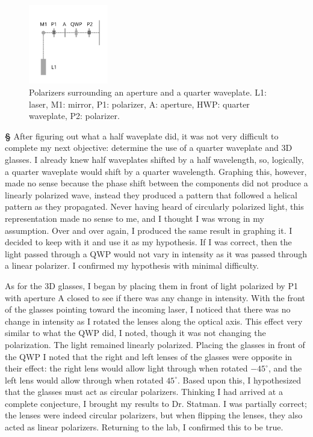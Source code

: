 \documentclass[12pt]{article}
\begin{document}
\newpage
\noindent
\begin{figure}
  \begin{center}
    \includegraphics[width=0.31\textwidth]{E2}
  \end{center}
  \caption{Polarizers surrounding an aperture and a quarter waveplate. L1: laser, M1: mirror, P1: polarizer, A: aperture, HWP: quarter waveplate, P2: polarizer.}\label{E2}
\end{figure}
\large{\textbf{\S}}
After figuring out what a half waveplate did, it was not very difficult to complete my next objective: determine the use of a quarter waveplate and 3D glasses. I already knew half waveplates shifted by a half wavelength, so, logically, a quarter waveplate would shift by a quarter wavelength. Graphing this, however, made no sense because the phase shift between the components did not produce a linearly polarized wave, instead they produced a pattern that followed a helical pattern as they propagated. Never having heard of circularly polarized light, this representation made no sense to me, and I thought I was wrong in my assumption. Over and over again, I produced the same result in graphing it. I decided to keep with it and use it as my hypothesis. If I was correct, then the light passed through a QWP would not vary in intensity as it was passed through a linear polarizer. I confirmed my hypothesis with minimal difficulty.

As for the 3D glasses, I began by placing them in front of light polarized by P1 with aperture A closed to see if there was any change in intensity. With the front of the glasses pointing toward the incoming laser, I noticed that there was no change in intensity as I rotated the lenses along the optical axis. This effect very similar to what the QWP did, I noted, though it was not changing the polarization. The light remained linearly polarized. Placing the glasses in front of the QWP I noted that the right and left lenses of the glasses were opposite in their effect: the right lens would allow light through when rotated $-45^{\circ}$, and the left lens would allow through when rotated $45^{\circ}$. Based upon this, I hypothesized that the glasses must act as circular polarizers. Thinking I had arrived at a complete conjecture, I brought my results to Dr. Statman. I was partially correct; the lenses were indeed circular polarizers, but when flipping the lenses, they also acted as linear polarizers. Returning to the lab, I confirmed this to be true.
\end{document}
